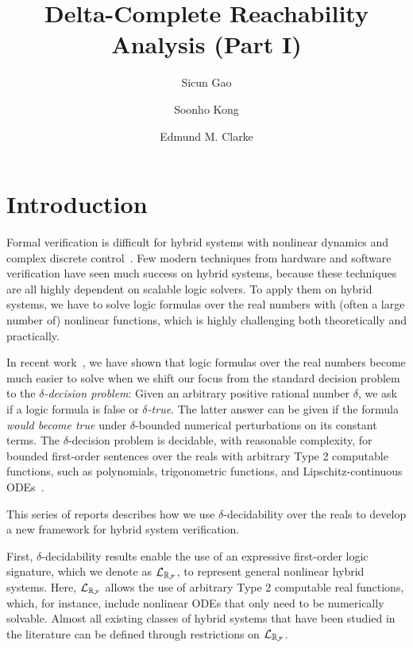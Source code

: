 \documentclass[12pt]{article}
\title{Delta-Complete Reachability Analysis (Part I)}
\author{Sicun Gao \and Soonho Kong \and Edmund M. Clarke}
\begin{document}
\renewcommand*{\thepage}{title-\arabic{page}}
\maketitle
\renewcommand*{\thepage}{\arabic{page}}


\section{Introduction}

Formal verification is difficult for hybrid systems with nonlinear dynamics and complex discrete control~\cite{DBLP:conf/emsoft/Alur11,DBLP:conf/lics/Henzinger96}. Few modern techniques from hardware and software verification have seen much success on hybrid systems, because these techniques are all highly dependent on scalable logic solvers. To apply them on hybrid systems, we have to solve logic formulas over the real numbers with (often a large number of) nonlinear functions, which is highly challenging both theoretically and practically. 

In recent work~\cite{DBLP:conf/lics/GaoAC12,DBLP:conf/cade/GaoAC12}, we have shown that logic formulas over the real numbers become much easier to solve when we shift our focus from the standard decision problem to the {\em $\delta$-decision problem}: Given an arbitrary positive rational number $\delta$, we ask if a logic formula is false or {\em $\delta$-true}. The latter answer can be given if the formula {\em would become true} under $\delta$-bounded numerical perturbations on its constant terms. The $\delta$-decision problem is decidable, with reasonable complexity, for bounded first-order sentences over the reals with arbitrary Type 2 computable functions, such as polynomials, trigonometric functions, and Lipschitz-continuous ODEs~\cite{CAbook}. 

This series of reports describes how we use $\delta$-decidability over the reals to develop a new framework for hybrid system verification.

First, $\delta$-decidability results enable the use of an expressive first-order logic signature, which we denote as $\mathcal{L}_{\mathbb{R}_{\mathcal{F}}}$, to represent general nonlinear hybrid systems. Here, $\mathcal{L}_{\mathbb{R}_{\mathcal{F}}}$ allows the use of arbitrary Type 2 computable real functions, which, for instance, include nonlinear ODEs that only need to be numerically solvable. Almost all existing classes of hybrid systems that have been studied in the literature can be defined through restrictions on $\mathcal{L}_{\mathbb{R}_{\mathcal{F}}}$. 
\end{document}
